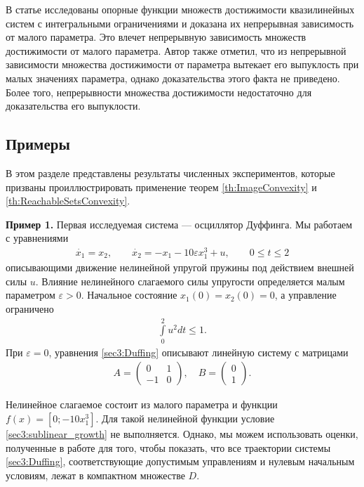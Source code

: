\documentclass[../main.tex]{subfiles}
\begin{document}
\begin{zam} 
 В статье \cite{Albrecht2} исследованы опорные функции множеств достижимости квазилинейных систем с интегральными ограничениями и доказана их непрерывная зависимость от малого параметра.
 Это влечет непрерывную зависимость множеств достижимости от малого параметра. 
 Автор также отметил, что из непрерывной зависимости множества достижимости от параметра вытекает его выпуклость при малых значениях параметра, однако доказательства этого факта не приведено. 
 Более того, непрерывности множества достижимости недостаточно для доказательства его выпуклости.
\end{zam}

\subsection{Примеры}

В этом разделе представлены результаты численных экспериментов, которые призваны проиллюстрировать применение теорем \ref{th:ImageConvexity} и \ref{th:ReachableSetsConvexity}. 

\textbf{Пример 1.}
 Первая исследуемая система --- осциллятор Дуффинга. 
 Мы работаем с уравнениями
 \begin{gather}\label{sec3:Duffing}
 \dot{x_1} = x_2, \qquad
 \dot{x_2} = -x_1 - 10 \varepsilon x_1^3 + u,\qquad 0\leqslant t \leqslant 2
 \end{gather}
 описывающими движение нелинейной упругой пружины под действием внешней силы $u$. 
 Влияние нелинейного слагаемого силы упругости определяется малым параметром $\varepsilon > 0$. 
Начальное состояние $x_1(0) = x_2(0) = 0 $, а управление ограничено 
 \begin{gather}\label{Duffing_controls}
 \int\limits_0^2u^2dt \leqslant 1.
 \end{gather}
 При $\varepsilon = 0$, уравнения \eqref{sec3:Duffing} описывают линейную систему с матрицами 
 \begin{gather*}
 A = \begin{pmatrix} 0 & 1\\
 -1 & 0
 \end{pmatrix}, \quad B = \begin{pmatrix}
 0\\
 1
 \end{pmatrix}.
 \end{gather*}
 
 Нелинейное слагаемое состоит из малого параметра и функции $f(x) = [0;-10x_1^3]$. 
 Для такой нелинейной функции условие \eqref{sec3:sublinear_growth} не выполняется. 
 Однако, мы можем использовать оценки, полученные в работе \cite{Zykov2019} для того, чтобы показать, что все траектории системы \eqref{sec3:Duffing}, соответствующие допустимым управлениям и нулевым начальным условиям, лежат в компактном множестве $D$. 
 
\end{document}
